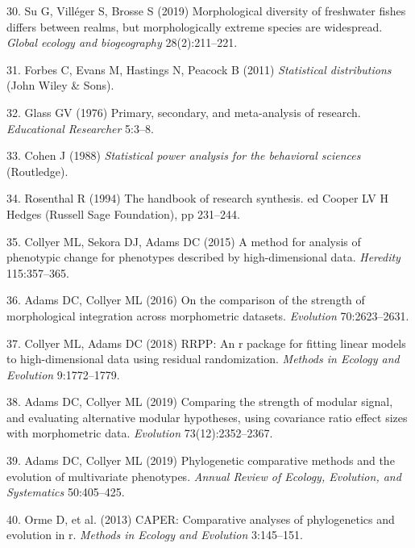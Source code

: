 \documentclass[9pt,twocolumn,twoside,lineno]{pnas-new}
\begin{document}
\leavevmode\hypertarget{ref-Su2019}{}%
30. Su G, Villéger S, Brosse S (2019) Morphological diversity of
freshwater fishes differs between realms, but morphologically extreme
species are widespread. \emph{Global ecology and biogeography}
28(2):211--221.

\leavevmode\hypertarget{ref-Forbes2011}{}%
31. Forbes C, Evans M, Hastings N, Peacock B (2011) \emph{Statistical
distributions} (John Wiley \& Sons).

\leavevmode\hypertarget{ref-Glass1976}{}%
32. Glass GV (1976) Primary, secondary, and meta-analysis of research.
\emph{Educational Researcher} 5:3--8.

\leavevmode\hypertarget{ref-Cohen1988}{}%
33. Cohen J (1988) \emph{Statistical power analysis for the behavioral
sciences} (Routledge).

\leavevmode\hypertarget{ref-Rosenthal1994}{}%
34. Rosenthal R (1994) The handbook of research synthesis. ed Cooper LV
H Hedges (Russell Sage Foundation), pp 231--244.

\leavevmode\hypertarget{ref-Collyer_et_al2015a}{}%
35. Collyer ML, Sekora DJ, Adams DC (2015) A method for analysis of
phenotypic change for phenotypes described by high-dimensional data.
\emph{Heredity} 115:357--365.

\leavevmode\hypertarget{ref-AdamsCollyer2016}{}%
36. Adams DC, Collyer ML (2016) On the comparison of the strength of
morphological integration across morphometric datasets. \emph{Evolution}
70:2623--2631.

\leavevmode\hypertarget{ref-CollyerAdams2018}{}%
37. Collyer ML, Adams DC (2018) RRPP: An r package for fitting linear
models to high-dimensional data using residual randomization.
\emph{Methods in Ecology and Evolution} 9:1772--1779.

\leavevmode\hypertarget{ref-AdamsCollyer2019b}{}%
38. Adams DC, Collyer ML (2019) Comparing the strength of modular
signal, and evaluating alternative modular hypotheses, using covariance
ratio effect sizes with morphometric data. \emph{Evolution}
73(12):2352--2367.

\leavevmode\hypertarget{ref-AdamsCollyer2019}{}%
39. Adams DC, Collyer ML (2019) Phylogenetic comparative methods and the
evolution of multivariate phenotypes. \emph{Annual Review of Ecology,
Evolution, and Systematics} 50:405--425.

\leavevmode\hypertarget{ref-Orme2013}{}%
40. Orme D, et al. (2013) CAPER: Comparative analyses of phylogenetics
and evolution in r. \emph{Methods in Ecology and Evolution} 3:145--151.
\end{document}
